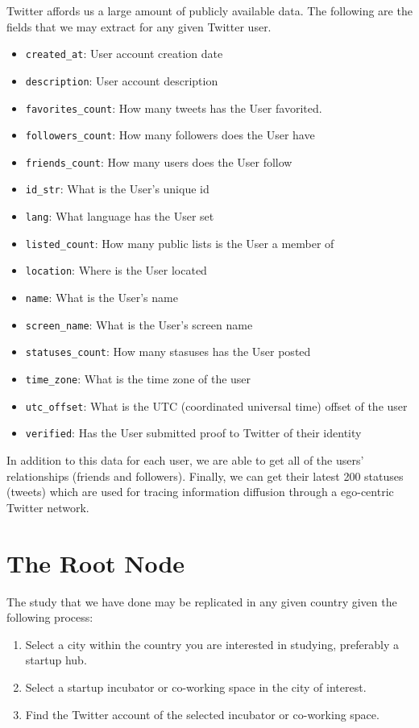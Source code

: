 Twitter affords us a large amount of publicly available data. The
following are the fields that we may extract for any given Twitter
user.

\begin{itemize}
\item \verb|created_at|: User account creation date
\item \verb|description|: User account description
\item \verb|favorites_count|: How many tweets has the User favorited.
\item \verb|followers_count|: How many followers does the User have
\item \verb|friends_count|: How many users does the User follow
\item \verb|id_str|: What is the User's unique id
\item \verb|lang|: What language has the User set
\item \verb|listed_count|: How many public lists is the User a member of
\item \verb|location|: Where is the User located
\item \verb|name|: What is the User's name
\item \verb|screen_name|: What is the User's screen name
\item \verb|statuses_count|: How many stasuses has the User posted
\item \verb|time_zone|: What is the time zone of the user
\item \verb|utc_offset|: What is the UTC (coordinated universal time) offset of the user
\item \verb|verified|: Has the User submitted proof to Twitter of their identity
\end{itemize}

In addition to this data for each user, we are able to get all of the
users' relationships (friends and followers). Finally, we can get
their latest 200 statuses (tweets) which are used for tracing
information diffusion through a ego-centric Twitter network.

\section{The Root Node}
The study that we have done may be replicated in any given country
given the following process:

\begin{enumerate}
\item Select a city within the country you are interested in studying,
  preferably a startup hub.
\item Select a startup incubator or co-working space in the city of
  interest.
\item Find the Twitter account of the selected incubator or co-working
  space.
\end{enumerate}

